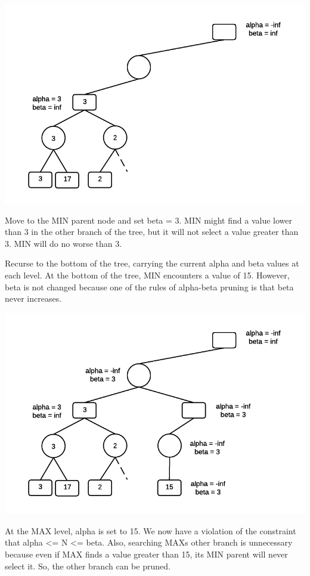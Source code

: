 \documentclass[12pt]{article}
\makeatletter
\def\maxwidth{\ifdim\Gin@nat@width>\linewidth\linewidth
    \else\Gin@nat@width\fi}
\let\Oldincludegraphics\includegraphics
\renewcommand{\includegraphics}[1]{\Oldincludegraphics[width=.8\maxwidth]{#1}}
\makeatother
\begin{document}
\includegraphics{img/ABExample5.png}

Move to the MIN parent node and set beta = 3. MIN might find a value
lower than 3 in the other branch of the tree, but it will not select a
value greater than 3. MIN will do no worse than 3.

Recurse to the bottom of the tree, carrying the current alpha and beta
values at each level. At the bottom of the tree, MIN encounters a value
of 15. However, beta is not changed because one of the rules of
alpha-beta pruning is that beta never increases.

\includegraphics{img/ABExample6.png}

At the MAX level, alpha is set to 15. We now have a violation of the
constraint that alpha \textless{}= N \textless{}= beta. Also, searching
MAXs other branch is unnecessary because even if MAX finds a value
greater than 15, its MIN parent will never select it. So, the other
branch can be pruned.
\end{document}

